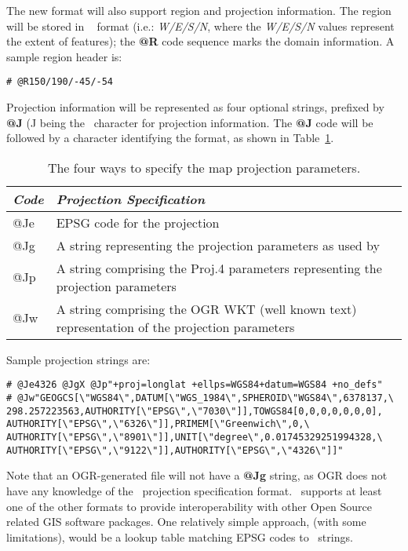 The new format will also support region and projection information. The
region will be stored in \GMT\  format (i.e.: \emph{W/E/S/N},
where the \emph{W/E/S/N} values represent the extent of features); the
\textbf{@R} code sequence marks the domain information.
A sample region header is:

\begin{verbatim}
# @R150/190/-45/-54
\end{verbatim}

Projection information will be represented as four optional strings,
prefixed by \textbf{@J} (J being the \GMT\ character for projection information.
The \textbf{@J} code will be followed by a character identifying the format, as shown
in Table~\ref{tbl:projectspec}.

\begin{table}[H]
\small
\centering
\begin{tabular}{|l|l|}  \hline
\emph{Code}	&	\emph{Projection Specification} \\ \hline \hline
@Je	&	EPSG code for the projection \\ \hline
@Jg	&	A string representing the projection parameters as used by \GMT\ \\ \hline
@Jp	&	A string comprising the Proj.4 parameters representing the projection parameters \\ \hline
@Jw	&	A string comprising the OGR WKT (well known text) representation of the projection parameters \\ \hline
\end{tabular}
\label{tbl:projectspec}
\caption{The four ways to specify the map projection parameters.}
\end{table} 

Sample projection strings are:

\begin{verbatim}
# @Je4326 @JgX @Jp"+proj=longlat +ellps=WGS84+datum=WGS84 +no_defs"
# @Jw"GEOGCS[\"WGS84\",DATUM[\"WGS_1984\",SPHEROID\"WGS84\",6378137,\
298.257223563,AUTHORITY[\"EPSG\",\"7030\"]],TOWGS84[0,0,0,0,0,0,0],
AUTHORITY[\"EPSG\",\"6326\"]],PRIMEM[\"Greenwich\",0,\
AUTHORITY[\"EPSG\",\"8901\"]],UNIT[\"degree\",0.01745329251994328,\
AUTHORITY[\"EPSG\",\"9122\"]],AUTHORITY[\"EPSG\",\"4326\"]]"
\end{verbatim}

Note that an OGR-generated file will not have a \textbf{@Jg} string, as OGR does
not have any knowledge of the \GMT\ projection specification format. 
\GMT\ supports at least one of the other formats to provide interoperability with other Open Source
related GIS software packages. One relatively simple approach, (with
some limitations), would be a lookup table matching EPSG codes to \GMT\ strings. 

